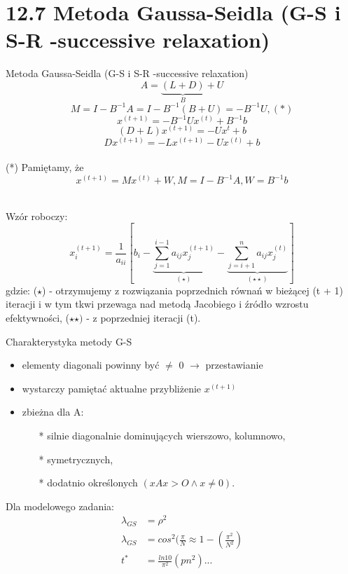 \section{12.7 Metoda Gaussa-Seidla (G-S i S-R -successive relaxation)}

\begin{frame}{Metoda Gaussa-Seidla (G-S i S-R -successive relaxation)}
  $$A=\underbrace{(L+D)}_{B}+U$$
  $$M=I-B^{-1}A=I-B^{-1}(B+U)=-B^{-1}U, (*)$$
  $$x^{(t+1)}=-B^{-1}Ux^{(t)}+B^{-1}b$$
  $$(D+L)x^{(t+1)}=-Ux^t+b$$
  $$\boxed{Dx^{(t+1)}=-Lx^{(t+1)}-Ux^{(t)}+b}$$
  \ \\
  (*) Pamiętamy, że $$x^{(t+1)} = M x^{(t)} + W, M=I-B^{-1}A, W = B^{-1}b$$\\
\end{frame}

\begin{frame}{}
  Wzór roboczy:
  $$x^{(t+1)}_i=\frac{1}{a_{ii}}[b_i-\underbrace{\sum^{i-1}_{j=1} a_{ij}x^{(t+1)}_j}_{(\star)}-\underbrace{\sum^{n}_{j=i+1} a_{ij}x^{(t)}_{j}}_{(\star\star)}]$$
  gdzie: ($\star$) - otrzymujemy z rozwiązania poprzednich równań w bieżącej (t + 1) iteracji i w tym tkwi przewaga nad metodą Jacobiego i źródło wzrostu efektywności, ($\star\star)$ - z poprzedniej iteracji (t).
\end{frame}

\begin{frame}{}
  \begin{block}{Charakterystyka metody G-S}
    \begin{itemize}
      \item elementy diagonali powinny być $\neq$ 0 $\rightarrow$ przestawianie
      \item wystarczy pamiętać aktualne przybliżenie $x^{(t+1)}$
      \item zbieżna dla A:
      \begin{itemize}
        \item[*] silnie diagonalnie dominujących wierszowo, kolumnowo,
        \item[*] symetrycznych,
        \item[*] dodatnio określonych $(xAx>O\wedge x\neq 0)$.
      \end{itemize}
    \end{itemize}
  \end{block}
\end{frame}

\begin{frame}{}
  Dla modelowego zadania:
  \begin{align*}
  \lambda_{GS}&=\rho^2\\
  \lambda_{GS}&=cos^2(\frac{\pi}{N}\approx 1-(\frac{\pi^2}{N^2})\\
          t^* &= \frac{ln10}{\pi^2}(pn^2)...
  \end{align*}
\end{frame}

